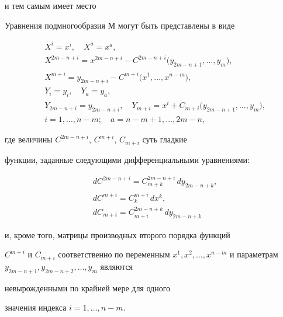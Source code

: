 и тем самым имеет место 





\begin{thm}


Уравнения подмногообразия М могут быть представлены в виде


\begin{align*}


&X^i=x^i,\quad X^a=x^a,\\


%


&X^{2m-n+i}=x^{2m-n+i}-C^{2m-n+i}\big(y_{2m-n+1}, \dotsc, y_m\big),\\


%


&X^{m+i}=y_{2m-n+i}-C^{m+i}\big(x^1,\dotsc, x^{n-m}\big),\\


%


&Y_i=y_i,\quad Y_a=y_a,\\


%


&Y_{2m-n+i}=y_{2m-n+i},\quad Y_{m+i}=x^i+C_{m+i}\big(y_{2m-n+1}, \dotsc,


y_m\big),\\


%


&i=1, \dotsc, n-m;\quad a=n-m+1, \dotsc, 2m-n,


\end{align*}


где величины $C^{2m-n+i}$, $C^{m+i}$, $C_{m+i}$ суть гладкие


функции, заданные следующими дифференциальными уравнениями\/${:}$


\begin{align*}


&d C^{2m-n+i}=C^{2m-n+i}_{m+k}\, d y_{2m-n+k},\\


&d C^{m+i}=C^{m+i}_k\, d x^k,\\


&d C_{m+i}=C^{2m-n+k}_{m+i}\, d y_{2m-n+k}


\end{align*}


и, кроме того, матрицы производных второго порядка функций


$C^{m+i}$ и $C_{m+i}$ соответственно по переменным $x^1, x^2, \dotsc,


x^{n-m}$ и параметрам $y_{2m-n+1}, y_{2m-n+2}, \dotsc, y_m$ являются


невырожденными по крайней мере для одного


значения индекса $i=1, \dotsc, n - m$.


\end{thm}





